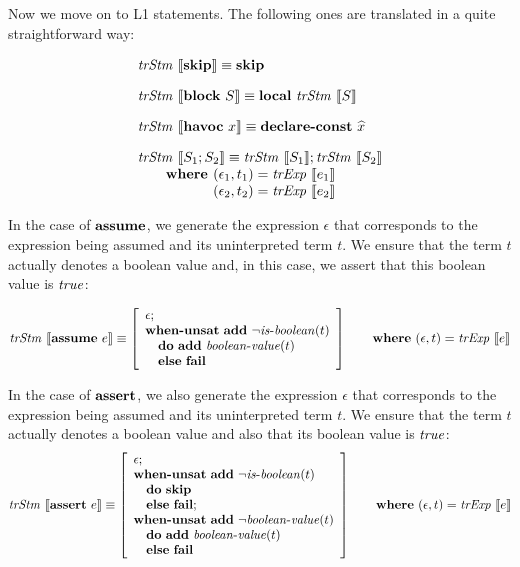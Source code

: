 Now we move on to L1 statements. The following ones are translated in a 
quite straightforward way:

\[
\begin{array}{l}
\trStm{\skipE} \equiv \skipE\\[1em]
\trStm{\blockE~S} \equiv \localE~\trStm{S}\\[1em]
\trStm{\havocE~x} \equiv \declareConstE{\widehat{x}}\\[1em]
\trStm{S_1;S_2} \equiv \trStm{S_1};\trStm{S_2}\\
\qquad \textbf{where }(\epsilon_1, t_1) = \trExps{e_1}\\
\qquad \phantom{\textbf{where }}(\epsilon_2, t_2) = \trExps{e_2}
\end{array}
\]

In the case of $\textbf{assume}$, we generate the expression $\epsilon$ that 
corresponds to the expression being assumed and its uninterpreted term $t$. 
We ensure that the term $t$ actually denotes a boolean value and, in this 
case, we assert that this boolean value is $\mathit{true}$:

\[
\mathit{trStm}~\llbracket\textbf{assume}~e\rrbracket \equiv 
\left[\begin{array}{l}
\epsilon;\\
\textbf{when-unsat}~\textbf{add}~\neg\mathit{is\mbox{-}boolean}(t)\\
\quad\textbf{do}~\textbf{add}~\mathit{boolean\mbox{-}value}(t)\\
\quad\textbf{else}~\textbf{fail}\\
\end{array}\right]
\qquad \textbf{where}~(\epsilon, t) = \mathit{trExp}~\llbracket e\rrbracket
\]

In the case of $\textbf{assert}$, we also generate the expression $\epsilon$ that 
corresponds to the expression being assumed and its uninterpreted term $t$. 
We ensure that the term $t$ actually denotes a boolean value and also that 
its boolean value is $\mathit{true}$:
\[
\mathit{trStm}~\llbracket\textbf{assert}~e\rrbracket \equiv
\left[\begin{array}{l}
\epsilon;\\
\textbf{when-unsat}~\textbf{add}~\neg\mathit{is\mbox{-}boolean}(t)\\
\quad\textbf{do}~\textbf{skip}\\
\quad\textbf{else}~\textbf{fail};\\
\textbf{when-unsat}~\textbf{add}~\neg\mathit{boolean\mbox{-}value}(t)\\
\quad\textbf{do}~\textbf{add}~\mathit{boolean\mbox{-}value}(t)\\
\quad\textbf{else}~\textbf{fail}\\
\end{array}\right]
\qquad \textbf{where}~(\epsilon, t) = \mathit{trExp}~\llbracket e\rrbracket
\]

